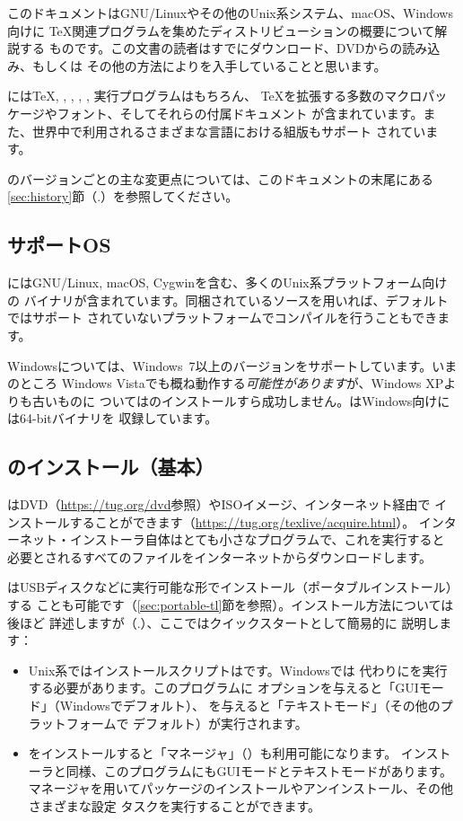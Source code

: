 \documentclass[uplatex,dvipdfmx,12pt,tombow]{jsarticle}
\begin{document}
このドキュメントはGNU/Linuxやその他のUnix系システム、macOS、Windows向けに
\TeX 関連プログラムを集めたディストリビューション\TL の概要について解説する
ものです。この文書の読者はすでにダウンロード、DVDからの読み込み、もしくは
その他の方法により\TL を入手していることと思います。

\TL には\TeX, \LaTeXe, \ConTeXt, \MF, \MP, \BibTeX 実行プログラムはもちろん、
\TeX を拡張する多数のマクロパッケージやフォント、そしてそれらの付属ドキュメント
が含まれています。また、世界中で利用されるさまざまな言語における組版もサポート
されています。

\TL のバージョンごとの主な変更点については、このドキュメントの末尾にある
\ref{sec:history}節（\p.\pageref{sec:history}）を参照してください。

\subsection{サポートOS}
\label{sec:os-support}

\TL にはGNU/Linux, macOS, Cygwinを含む、多くのUnix系プラットフォーム向けの
バイナリが含まれています。同梱されているソースを用いれば、デフォルトではサポート
されていないプラットフォームでコンパイルを行うこともできます。

Windowsについては、Windows~7以上のバージョンをサポートしています。いまのところ
Windows Vistaでも概ね動作する\emph{可能性があります}が、Windows XPよりも古いものに
ついては\TL のインストールすら成功しません。\TL はWindows向けには64-bitバイナリを
収録しています。

\subsection{\TL のインストール（基本）}
\label{sec:basic}

\TL はDVD（\url{https://tug.org/dvd}参照）やISOイメージ、インターネット経由で
インストールすることができます（\url{https://tug.org/texlive/acquire.html}）。
インターネット・インストーラ自体はとても小さなプログラムで、これを実行すると
必要とされるすべてのファイルをインターネットからダウンロードします。

\TL はUSBディスクなどに実行可能な形でインストール（ポータブルインストール）する
ことも可能です（\ref{sec:portable-tl}節を参照）。インストール方法については後ほど
詳述しますが（\p.\pageref{sec:install}）、ここではクイックスタートとして簡易的に
説明します：

\begin{itemize}
\item Unix系ではインストールスクリプトはです。Windowsでは
代わりにを実行する必要があります。このプログラムに
オプションを与えると「GUIモード」（Windowsでデフォルト）、
を与えると「テキストモード」（その他のプラットフォームで
デフォルト）が実行されます。

\item \TL をインストールすると「\TL マネージャ」（）も利用可能になります。
インストーラと同様、このプログラムにもGUIモードとテキストモードがあります。\TL
マネージャを用いてパッケージのインストールやアンインストール、その他さまざまな設定
タスクを実行することができます。
\end{itemize}
\end{document}
